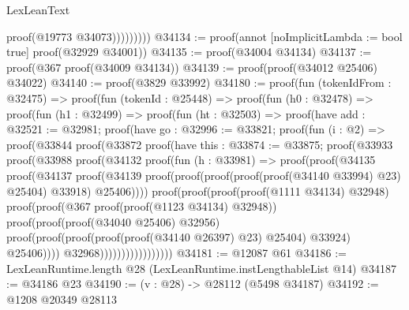 \begin{lexlean}{LexLeanText}
\begin{coremodule}
                                proof(@19773 @34073)))))))))
@34134 := proof(annot [noImplicitLambda := bool true] proof(@32929 @34001))
@34135 := proof(@34004 @34134)
@34137 := proof(@367 proof(@34009 @34134))
@34139 := proof(proof(@34012 @25406) @34022)
@34140 := proof(@3829 @33992)
@34180 := proof(fun (tokenIdFrom : @32475) =>
    proof(fun (tokenId : @25448) =>
      proof(fun (h0 : @32478) =>
        proof(fun (h1 : @32499) =>
          proof(fun (ht : @32503) =>
            proof(have add : @32521 := @32981;
              proof(have go : @32996 := @33821;
                proof(fun (i : @2) =>
                  proof(@33844
                      proof(@33872
                          proof(have this : @33874 := @33875;
                            proof(@33933
                                proof(@33988
                                    proof(@34132
                                        proof(fun (h : @33981) =>
                                          proof(proof(@34135
                                                proof(@34137
                                                    proof(@34139
                                                        proof(proof(proof(proof(proof(@34140 @33994)
                                                                  @23)
                                                                @25404)
                                                              @33918)
                                                            @25406))))
                                              proof(proof(proof(proof(@1111 @34134) @32948)
                                                    proof(proof(@367
                                                          proof(proof(@1123 @34134) @32948))
                                                        proof(proof(proof(@34040 @25406) @32956)
                                                            proof(proof(proof(proof(proof(@34140
                                                                        @26397)
                                                                      @23)
                                                                    @25404)
                                                                  @33924)
                                                                @25406))))
                                                  @32968)))))))))))))))))
@34181 := @12087 @61
@34186 := LexLeanRuntime.length @28 (LexLeanRuntime.instLengthableList @14)
@34187 := @34186 @23
@34190 := (v : @28) -> @28112 (@5498 @34187)
@34192 := @1208 @20349 @28113

\end{coremodule}
\end{lexlean}
